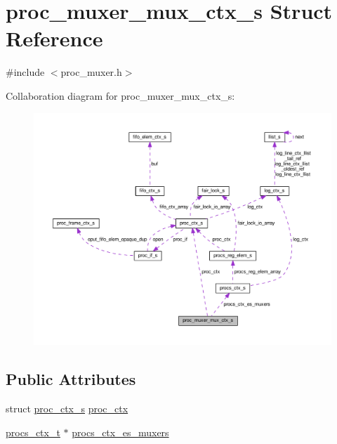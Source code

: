 \hypertarget{structproc__muxer__mux__ctx__s}{}\section{proc\+\_\+muxer\+\_\+mux\+\_\+ctx\+\_\+s Struct Reference}
\label{structproc__muxer__mux__ctx__s}


{\ttfamily \#include $<$proc\+\_\+muxer.\+h$>$}



Collaboration diagram for proc\+\_\+muxer\+\_\+mux\+\_\+ctx\+\_\+s\+:\nopagebreak
\begin{figure}[H]
\begin{center}
\leavevmode
\includegraphics[width=350pt]{structproc__muxer__mux__ctx__s__coll__graph}
\end{center}
\end{figure}
\subsection*{Public Attributes}
\begin{DoxyCompactItemize}
\item 
struct \hyperlink{structproc__ctx__s}{proc\+\_\+ctx\+\_\+s} \hyperlink{structproc__muxer__mux__ctx__s_a1d2b1128b9800f2d9c2b448b135ed485}{proc\+\_\+ctx}
\item 
\hyperlink{procs_8c_a9dcafd40720bff127bdc596e9c6dd6cd}{procs\+\_\+ctx\+\_\+t} $\ast$ \hyperlink{structproc__muxer__mux__ctx__s_a84af6e2e29870974e5fdd964ba5b0898}{procs\+\_\+ctx\+\_\+es\+\_\+muxers}
\end{DoxyCompactItemize}


